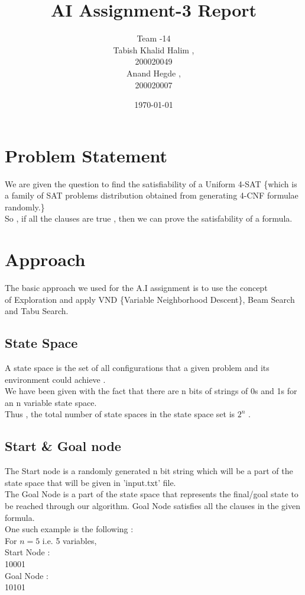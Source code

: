 \documentclass{article}
\title{AI Assignment-3 Report}
\date{\today}
\author{Team -14 \\Tabish Khalid Halim , \\ 200020049 \\ Anand Hegde , \\ 200020007}
\affil{Department of Computer Science, IIT Dharwad}
\begin{document}
\maketitle
{}
\newpage
\tableofcontents

\newpage
{}
\section{Problem Statement}
We are given the question to find the satisfiability of a Uniform 4-SAT \{which is a family of SAT problems distribution obtained from generating 4-CNF formulae randomly.\}
\\So , if all the clauses are true , then we can prove the satisfability of a formula.
\vspace{10pt}
\section{Approach}
The basic approach we used for the A.I assignment is to use the concept \\of Exploration and 
apply VND \{Variable Neighborhood Descent\}, Beam Search and Tabu Search.
\vspace{10pt}
\subsection*{State Space}
A state space is the set of all configurations that a given problem and its \\environment could achieve .
\vspace{10pt}
\\We have been given with the fact that there are n bits of strings of 0s and 1s for an n variable state space.
\\Thus , the total number of state spaces in the state space set is $2^n$ .
\subsection*{Start \& Goal node}
The Start node is a randomly generated n bit string which will be
a part of the state space that will be 
given in 'input.txt' file.
\\The Goal Node is a part of the state space that represents the final/goal state to be reached through
our algorithm. Goal Node satisfies all the clauses in the given formula.
\\One such example is the following :
\\For $n=5$ i.e. 5 variables,
\\Start Node :
\\10001
\\Goal Node :
\\10101
\newpage
\end{document}
